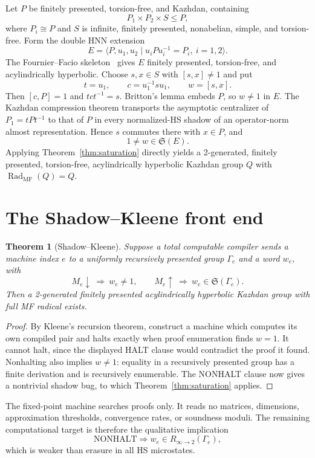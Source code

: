 \documentclass[10pt]{amsart}
\newtheorem{theorem}{Theorem}[section]
\theoremstyle{definition}
\theoremstyle{remark}
\newcommand{\Shadow}{\mathfrak S}
\newcommand{\MFRad}{\operatorname{Rad}_{\mathrm{MF}}}
\begin{document}
Let $P$ be finitely presented, torsion-free, and Kazhdan, containing
\[
 P_1\times P_2\times S\leq P,
\]
where $P_i\cong P$ and $S$ is infinite, finitely presented, nonabelian,
simple, and torsion-free.  Form the double HNN extension
\[
 E=\langle P,u_1,u_2\mid u_iPu_i^{-1}=P_i,\ i=1,2\rangle.
\]
The Fournier--Facio skeleton~\cite{FF} gives $E$ finitely presented,
torsion-free, and acylindrically hyperbolic.  Choose $s,x\in S$ with
$[s,x]\neq1$ and put
\[
 t=u_1,\qquad c=u_1^{-1}su_1,\qquad w=[s,x].
\]
Then $[c,P]=1$ and $tct^{-1}=s$.  Britton's lemma embeds $P$, so $w\neq1$
in $E$.  The Kazhdan compression theorem transports the asymptotic
centralizer of $P_1=tPt^{-1}$ to that of $P$ in every normalized-HS shadow
of an operator-norm almost representation.  Hence $s$ commutes there with
$x\in P$, and
\[
 1\neq w\in\Shadow(E).
\]
Applying Theorem~\ref{thm:saturation} directly yields a 2-generated,
finitely presented, torsion-free, acylindrically hyperbolic Kazhdan group
$Q$ with $\MFRad(Q)=Q$.

\section{The Shadow--Kleene front end}

\begin{theorem}[Shadow--Kleene]
Suppose a total computable compiler sends a machine index $e$ to a uniformly
recursively presented group $\Gamma_e$ and a word $w_e$, with
\[
 M_e\downarrow\ \Longrightarrow\ w_e\neq1,
 \qquad
 M_e\uparrow\ \Longrightarrow\ w_e\in\Shadow(\Gamma_e).
\]
Then a 2-generated finitely presented acylindrically hyperbolic Kazhdan
group with full MF radical exists.
\end{theorem}

\begin{proof}
By Kleene's recursion theorem, construct a machine which computes its own
compiled pair and halts exactly when proof enumeration finds $w=1$.  It
cannot halt, since the displayed HALT clause would contradict the proof it
found.  Nonhalting also implies $w\neq1$: equality in a recursively
presented group has a finite derivation and is recursively enumerable.  The
NONHALT clause now gives a nontrivial shadow bug, to which
Theorem~\ref{thm:saturation} applies.
\end{proof}

The fixed-point machine searches proofs only.  It reads no matrices,
dimensions, approximation thresholds, convergence rates, or soundness
moduli.  The remaining computational target is therefore the qualitative
implication
\[
 \text{NONHALT}\Longrightarrow w_e\in R_{\infty\to2}(\Gamma_e),
\]
which is weaker than erasure in all HS microstates.
\end{document}
